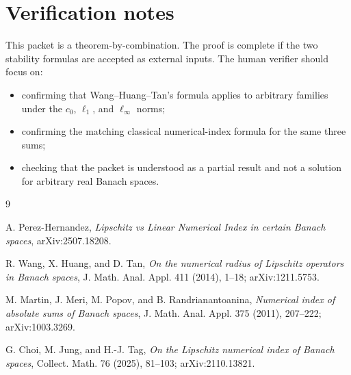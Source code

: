 \documentclass[11pt]{article}
\begin{document}
\section*{Verification notes}

This packet is a theorem-by-combination. The proof is complete if the two
stability formulas are accepted as external inputs. The human verifier should
focus on:
\begin{itemize}
\item confirming that Wang--Huang--Tan's formula applies to arbitrary
families under the \(c_0\), \(\ell_1\), and \(\ell_\infty\) norms;
\item confirming the matching classical numerical-index formula for the same
three sums;
\item checking that the packet is understood as a partial result and not a
solution for arbitrary real Banach spaces.
\end{itemize}

\begin{thebibliography}{9}

A. Perez-Hernandez,
\emph{Lipschitz vs Linear Numerical Index in certain Banach spaces},
arXiv:2507.18208.

R. Wang, X. Huang, and D. Tan,
\emph{On the numerical radius of Lipschitz operators in Banach spaces},
J. Math. Anal. Appl. 411 (2014), 1--18; arXiv:1211.5753.

M. Martin, J. Meri, M. Popov, and B. Randrianantoanina,
\emph{Numerical index of absolute sums of Banach spaces},
J. Math. Anal. Appl. 375 (2011), 207--222; arXiv:1003.3269.

G. Choi, M. Jung, and H.-J. Tag,
\emph{On the Lipschitz numerical index of Banach spaces},
Collect. Math. 76 (2025), 81--103; arXiv:2110.13821.

\end{thebibliography}
\end{document}
